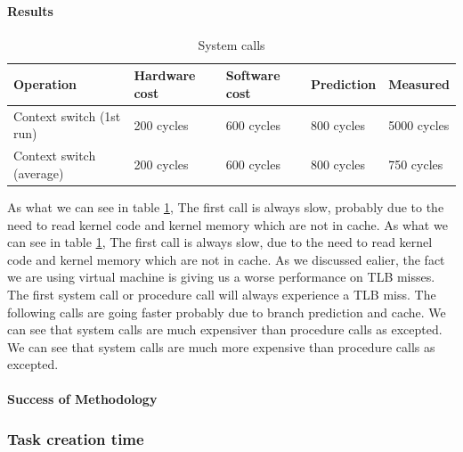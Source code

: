 \paragraph{Results}
\begin{table} [h]
\begin{center}
\begin{tabular}{| l | l | l | l | l |}
\hline
Operation & Hardware cost & Software cost & Prediction & Measured \\
\hline
Context switch (1st run) & 200 cycles & 600 cycles & 800 cycles & 5000 cycles\\
\hline
Context switch (average) & 200 cycles & 600 cycles & 800 cycles & 750 cycles\\
\hline
\end{tabular}
\end{center}

\caption{System calls\label {tab:sysCall}}
\end{table}

As what we can see in table \ref{tab:sysCall}, The first call is always slow, probably due to the need to read kernel code and
kernel memory which are not in cache.
As what we can see in table \ref{tab:sysCall}, The first call is always slow, due to the need to read kernel code and
kernel memory which are not in cache. As we discussed ealier, the fact we are using virtual machine is giving us a worse performance on TLB misses. The first system call or procedure call will always experience a TLB miss.
The following calls are going faster probably due to branch prediction and
cache.
We can see that system calls are much expensiver than procedure calls as
excepted.
We can see that system calls are much more expensive than procedure calls as excepted.


\paragraph{Success of Methodology}


\subsubsection{Task creation time}
